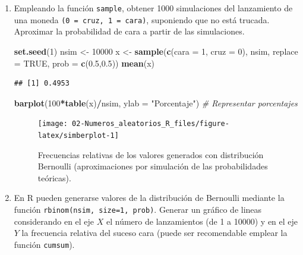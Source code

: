 \documentclass[
]{book}
\newenvironment{Shaded}{\begin{snugshade}}{\end{snugshade}}
\newcommand{\CommentTok}[1]{\textcolor[rgb]{0.56,0.35,0.01}{\textit{#1}}}
\newcommand{\DataTypeTok}[1]{\textcolor[rgb]{0.13,0.29,0.53}{#1}}
\newcommand{\DecValTok}[1]{\textcolor[rgb]{0.00,0.00,0.81}{#1}}
\newcommand{\FloatTok}[1]{\textcolor[rgb]{0.00,0.00,0.81}{#1}}
\newcommand{\KeywordTok}[1]{\textcolor[rgb]{0.13,0.29,0.53}{\textbf{#1}}}
\newcommand{\NormalTok}[1]{#1}
\newcommand{\OperatorTok}[1]{\textcolor[rgb]{0.81,0.36,0.00}{\textbf{#1}}}
\newcommand{\OtherTok}[1]{\textcolor[rgb]{0.56,0.35,0.01}{#1}}
\newcommand{\StringTok}[1]{\textcolor[rgb]{0.31,0.60,0.02}{#1}}
\theoremstyle{break}
\theoremstyle{definition}
\theoremstyle{definition}
\theoremstyle{definition}
\theoremstyle{remark}
\begin{document}
\begin{enumerate}
\def\labelenumi{\alph{enumi})}
\item
  Empleando la función \texttt{sample}, obtener 1000 simulaciones del
  lanzamiento de una moneda \texttt{(0\ =\ cruz,\ 1\ =\ cara)}, suponiendo que
  no está trucada. Aproximar la probabilidad de cara a partir de
  las simulaciones.

\begin{Shaded}
\begin{Highlighting}[]
\KeywordTok{set.seed}\NormalTok{(}\DecValTok{1}\NormalTok{)}
\NormalTok{nsim <-}\StringTok{ }\DecValTok{10000}
\NormalTok{x <-}\StringTok{ }\KeywordTok{sample}\NormalTok{(}\KeywordTok{c}\NormalTok{(}\DataTypeTok{cara =} \DecValTok{1}\NormalTok{, }\DataTypeTok{cruz =} \DecValTok{0}\NormalTok{), nsim, }\DataTypeTok{replace =} \OtherTok{TRUE}\NormalTok{, }\DataTypeTok{prob =} \KeywordTok{c}\NormalTok{(}\FloatTok{0.5}\NormalTok{,}\FloatTok{0.5}\NormalTok{))}
\KeywordTok{mean}\NormalTok{(x)}
\end{Highlighting}
\end{Shaded}

\begin{verbatim}
## [1] 0.4953
\end{verbatim}

\begin{Shaded}
\begin{Highlighting}[]
\KeywordTok{barplot}\NormalTok{(}\DecValTok{100}\OperatorTok{*}\KeywordTok{table}\NormalTok{(x)}\OperatorTok{/}\NormalTok{nsim, }\DataTypeTok{ylab =} \StringTok{"Porcentaje"}\NormalTok{) }\CommentTok{# Representar porcentajes }
\end{Highlighting}
\end{Shaded}

  \begin{figure}[!htb]

  {\centering \texttt{[image: 02-Numeros\_aleatorios\_R\_files/figure-latex/simberplot-1]} 

  }

  \caption{Frecuencias relativas de los valores generados con distribución Bernoulli (aproximaciones por simulación de las probabilidades teóricas).}\label{fig:simberplot}
  \end{figure}
\item
  En R pueden generarse valores de la distribución de Bernoulli
  mediante la función \texttt{rbinom(nsim,\ size=1,\ prob)}. Generar un
  gráfico de lineas considerando en el eje \(X\) el número de
  lanzamientos (de 1 a 10000) y en el eje \(Y\) la frecuencia
  relativa del suceso cara (puede ser recomendable emplear la
  función \texttt{cumsum}).


\end{enumerate}
\end{document}
